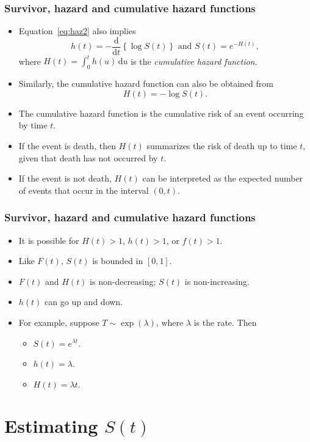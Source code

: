 \documentclass[10pt]{beamer}\usepackage[]{graphicx}\usepackage[]{color}
\newcommand{\dif}{\mathrm{d}}
\newcommand{\empr}[1]{{\emph{\color{red}#1}}}
\begin{document}
\begin{frame}
  \frametitle{Survivor, hazard and cumulative hazard functions}
  \begin{itemize}
    \item Equation~\eqref{eq:haz2} also implies
      $$h(t) = -\frac{\dif}{\dif t}\left\{ \log S(t)\right\} \mbox{ and } S(t) = e^{-H(t)},$$
      where $H(t) = \int_0^th(u)\,\dif u$ is the \empr{cumulative hazard function}.
    \item Similarly, the cumulative hazard function can also be obtained from 
      $$H(t) = -\log S(t).$$
    \item The cumulative hazard function is the cumulative risk of an event occurring by time $t$.
    \item If the event is death, then $H(t)$ summarizes the risk of death up to time $t$, given that death has not occurred by $t$.
    \item If the event is not death, $H(t)$ can be interpreted as the expected number of events that occur in the interval $(0, t)$.
  \end{itemize}
\end{frame}


\begin{frame}
  \frametitle{Survivor, hazard and cumulative hazard functions}
  \begin{itemize}
    \item It is possible for $H(t) > 1$, $h(t) > 1$, or $f(t) > 1$.
    \item Like $F(t)$, $S(t)$ is bounded in $[0, 1]$.
    \item $F(t)$ and $H(t)$ is non-decreasing; $S(t)$ is non-increasing.
    \item $h(t)$ can go up and down.
    \item For example, suppose $T\sim\exp(\lambda)$, where $\lambda$ is the rate. Then
      \begin{itemize}
      \item $S(t) = e^{\lambda t}$.
      \item $h(t) = \lambda$.
      \item $H(t) = \lambda t$.
  \end{itemize}
\end{itemize}
\end{frame}

\section{Estimating $S(t)$}
\end{document}
